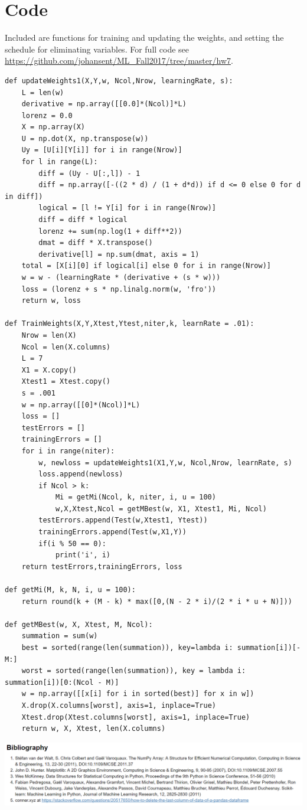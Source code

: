 \documentclass[letter]{article} %
\begin{document}
\section*{Code}

Included are functions for training and updating the weights, and setting the schedule for eliminating variables. For full code see \url{https://github.com/johansent/ML_Fall2017/tree/master/hw7}.

\begin{verbatim}
def updateWeights1(X,Y,w, Ncol,Nrow, learningRate, s):
    L = len(w)
    derivative = np.array([[0.0]*(Ncol)]*L)
    lorenz = 0.0
    X = np.array(X)
    U = np.dot(X, np.transpose(w))
    Uy = [U[i][Y[i]] for i in range(Nrow)]
    for l in range(L):
        diff = (Uy - U[:,l]) - 1
        diff = np.array([-((2 * d) / (1 + d*d)) if d <= 0 else 0 for d in diff])
        logical = [l != Y[i] for i in range(Nrow)]
        diff = diff * logical
        lorenz += sum(np.log(1 + diff**2))
        dmat = diff * X.transpose()
        derivative[l] = np.sum(dmat, axis = 1)
    total = [X[i][0] if logical[i] else 0 for i in range(Nrow)] 
    w = w - (learningRate * (derivative + (s * w))) 
    loss = (lorenz + s * np.linalg.norm(w, 'fro'))
    return w, loss

def TrainWeights(X,Y,Xtest,Ytest,niter,k, learnRate = .01):
    Nrow = len(X)
    Ncol = len(X.columns)
    L = 7
    X1 = X.copy()
    Xtest1 = Xtest.copy()
    s = .001    
    w = np.array([[0]*(Ncol)]*L)    
    loss = []
    testErrors = []
    trainingErrors = []
    for i in range(niter): 
        w, newloss = updateWeights1(X1,Y,w, Ncol,Nrow, learnRate, s)
        loss.append(newloss)
        if Ncol > k:
            Mi = getMi(Ncol, k, niter, i, u = 100)
            w,X,Xtest,Ncol = getMBest(w, X1, Xtest1, Mi, Ncol)
        testErrors.append(Test(w,Xtest1, Ytest))
        trainingErrors.append(Test(w,X1,Y))
        if(i % 50 == 0):
            print('i', i)
    return testErrors,trainingErrors, loss

def getMi(M, k, N, i, u = 100):
    return round(k + (M - k) * max([0,(N - 2 * i)/(2 * i * u + N)]))
    
def getMBest(w, X, Xtest, M, Ncol):
    summation = sum(w)
    best = sorted(range(len(summation)), key=lambda i: summation[i])[-M:]
    worst = sorted(range(len(summation)), key = lambda i: summation[i])[0:(Ncol - M)]
    w = np.array([[x[i] for i in sorted(best)] for x in w])
    X.drop(X.columns[worst], axis=1, inplace=True)
    Xtest.drop(Xtest.columns[worst], axis=1, inplace=True)
    return w, X, Xtest, len(X.columns)
\end{verbatim}

\includegraphics[scale=0.6]{bib}



\end{document}
